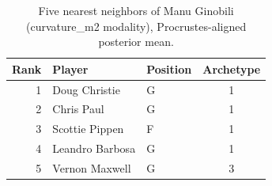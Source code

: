 \begin{table}[htbp]
  \centering\small
  \begin{tabular}{rllc}
    \toprule
    Rank & Player & Position & Archetype \\
    \midrule
    1 & Doug Christie & G & 1 \\
    2 & Chris Paul & G & 1 \\
    3 & Scottie Pippen & F & 1 \\
    4 & Leandro Barbosa & G & 1 \\
    5 & Vernon Maxwell & G & 3 \\
    \bottomrule
  \end{tabular}
  \caption{Five nearest neighbors of Manu Ginobili (curvature_m2 modality), Procrustes-aligned posterior mean.}
  \label{tab:Manu_Ginobili_neighbors_curvature_m2}
\end{table}

